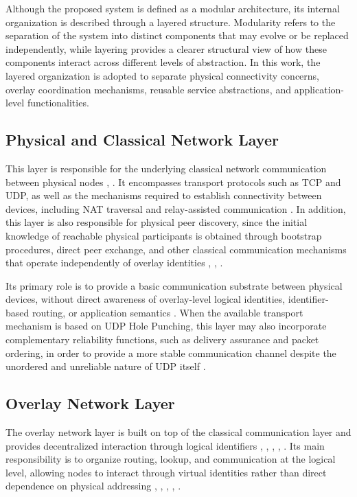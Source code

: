 \documentclass[
  12pt,
  oneside,
  a4paper,
  chapter=TITLE,
  section=TITLE,
  english,
  brazil
]{abntex2}
\begin{document}
\thesislayerstikz

Although the proposed system is defined as a modular architecture, its internal organization is described through a layered structure. Modularity refers to the separation of the system into distinct components that may evolve or be replaced independently, while layering provides a clearer structural view of how these components interact across different levels of abstraction. In this work, the layered organization is adopted to separate physical connectivity concerns, overlay coordination mechanisms, reusable service abstractions, and application-level functionalities.

\subsection{Physical and Classical Network Layer}

This layer is responsible for the underlying classical network communication between
physical nodes \cite{li2022unreachable}, \cite{augustine2022byzantine}. It encompasses transport protocols such as TCP and UDP, as
well as the mechanisms required to establish connectivity between devices, including
NAT traversal and relay-assisted communication \cite{li2022unreachable}. In addition, this layer is also
responsible for physical peer discovery, since the initial knowledge of reachable
physical participants is obtained through bootstrap procedures, direct peer exchange,
and other classical communication mechanisms that operate independently of overlay
identities \cite{li2022unreachable}, \cite{augustine2022byzantine}, \cite{qian2016garlic}.

Its primary role is to provide a basic communication substrate between physical
devices, without direct awareness of overlay-level logical identities, identifier-based
routing, or application semantics \cite{augustine2022byzantine}. When the available transport mechanism is based
on UDP Hole Punching, this layer may also incorporate complementary reliability
functions, such as delivery assurance and packet ordering, in order to provide a more
stable communication channel despite the unordered and unreliable nature of UDP
itself \cite{li2022unreachable}.

\subsection{Overlay Network Layer}

The overlay network layer is built on top of the classical communication layer and
provides decentralized interaction through logical identifiers \cite{stoica2001chord}, \cite{maymounkov2002kademlia}, \cite{rowstron2001pastry}, \cite{augustine2022byzantine}, \cite{mirzaei2018pk}. Its main
responsibility is to organize routing, lookup, and communication at the logical level,
allowing nodes to interact through virtual identities rather than direct dependence on
physical addressing \cite{stoica2001chord}, \cite{maymounkov2002kademlia}, \cite{rowstron2001pastry}, \cite{augustine2022byzantine}, \cite{mirzaei2018pk}.
\end{document}
